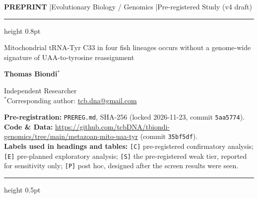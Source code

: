 \documentclass[11pt, a4paper]{article}
\begin{document}
{\noindent\small\color{slate}\textbf{PREPRINT} \quad|\quad Evolutionary Biology / Genomics \quad|\quad Pre-registered Study (v4 draft)}
\vspace{0.35em}
{\color{rulegray}\hrule height 0.8pt}
\vspace{1.0em}

{\LARGE\bfseries\color{navy}\raggedright
Mitochondrial tRNA-Tyr C33 in four fish lineages occurs without a genome-wide signature of UAA-to-tyrosine reassignment\par}

\vspace{0.9em}
{\large\textbf{Thomas Biondi}$^{*}$}

\vspace{0.3em}
{\small\color{slate}
Independent Researcher\\
$^{*}$Corresponding author: \href{mailto:tcb.dna@gmail.com}{tcb.dna@gmail.com}
}

\vspace{0.6em}
{\footnotesize\color{slate}
\textbf{Pre-registration:} \texttt{PREREG.md}, SHA-256 \texttt{} (locked 2026-11-23, commit \texttt{5aa5774}).\\
\textbf{Code \& Data:} \url{https://github.com/tcbDNA/tbiondi-genomics/tree/main/metazoan-mito-uaa-tyr} (commit \texttt{35bf5df}).\\
\textbf{Labels used in headings and tables:} \texttt{[C]} pre-registered confirmatory analysis; \texttt{[E]} pre-planned exploratory analysis; \texttt{[S]} the pre-registered weak tier, reported for sensitivity only; \texttt{[P]} post hoc, designed after the screen results were seen.
}

\vspace{0.8em}
{\color{rulegray}\hrule height 0.5pt}
\vspace{0.8em}

\end{document}
